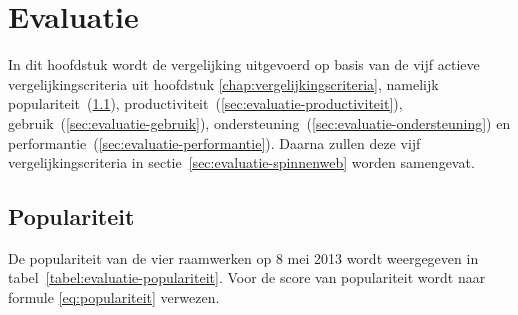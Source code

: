 \chapter{Evaluatie}
\label{chap:evaluatie}

In dit hoofdstuk wordt de vergelijking uitgevoerd op basis van de vijf actieve vergelijkingscriteria uit hoofdstuk \ref{chap:vergelijkingscriteria}, namelijk populariteit~(\ref{sec:evaluatie-populariteit}), productiviteit~(\ref{sec:evaluatie-productiviteit}), gebruik~(\ref{sec:evaluatie-gebruik}), ondersteuning~(\ref{sec:evaluatie-ondersteuning}) en performantie~(\ref{sec:evaluatie-performantie}). 
Daarna zullen deze vijf vergelijkingscriteria in sectie~\ref{sec:evaluatie-spinnenweb} worden samengevat.


\section{Populariteit} %
\label{sec:evaluatie-populariteit}

De populariteit van de vier raamwerken op 8 mei 2013 wordt weergegeven in tabel~\ref{tabel:evaluatie-populariteit}. 
Voor de score van populariteit wordt naar formule \ref{eq:populariteit} verwezen.

\begin{table}[H]
\centering
{}
\caption{Overzicht van populariteit op 8 mei 2013 voor \st{}~(\sta), \kendo{}~(\kendoa), \jqm{}~(\jqma) en \lungo{}~(\lungoa).}
\label{tabel:evaluatie-populariteit}
\end{table}

